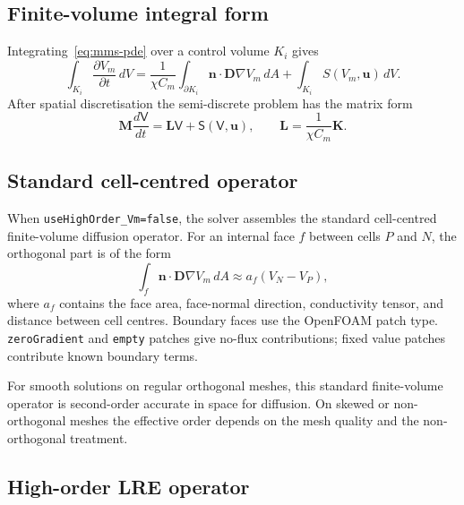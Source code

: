 \documentclass[11pt,a4paper]{article}
\newcommand{\code}[1]{\texttt{\small #1}}
\newcommand{\Vm}{V_m}
\newcommand{\Dten}{\mathbf{D}}
\newcommand{\grad}{\nabla}
\newcommand{\Mmass}{\mathbf{M}}
\newcommand{\Kstif}{\mathbf{K}}
\newcommand{\Lop}{\mathbf{L}}
\begin{document}
\subsection{Finite-volume integral form}

Integrating~\eqref{eq:mms-pde} over a control volume $K_i$ gives
\begin{equation}
  \int_{K_i}\frac{\partial \Vm}{\partial t}\,dV
  =
  \frac{1}{\chi C_m}
  \int_{\partial K_i}\mathbf{n}\cdot\Dten\grad\Vm\,dA
  +
  \int_{K_i}S(\Vm,\mathbf{u})\,dV.
  \label{eq:fv-integral}
\end{equation}
After spatial discretisation the semi-discrete problem has the matrix form
\begin{equation}
  \Mmass \frac{d\mathsf{V}}{dt}
  =
  \Lop \mathsf{V}
  +
  \mathsf{S}(\mathsf{V},\mathbf{u}),
  \qquad
  \Lop = \frac{1}{\chi C_m}\Kstif.
  \label{eq:semidiscrete}
\end{equation}

\subsection{Standard cell-centred operator}

When \code{useHighOrder\_Vm=false}, the solver assembles the standard
cell-centred finite-volume diffusion operator. For an internal face $f$ between
cells $P$ and $N$, the orthogonal part is of the form
\begin{equation}
  \int_f \mathbf{n}\cdot\Dten\grad\Vm\,dA
  \approx
  a_f(V_N-V_P),
\end{equation}
where $a_f$ contains the face area, face-normal direction, conductivity tensor,
and distance between cell centres. Boundary faces use the OpenFOAM patch type.
\code{zeroGradient} and \code{empty} patches give no-flux contributions; fixed
value patches contribute known boundary terms.

For smooth solutions on regular orthogonal meshes, this standard finite-volume
operator is second-order accurate in space for diffusion. On skewed or
non-orthogonal meshes the effective order depends on the mesh quality and the
non-orthogonal treatment.

\subsection{High-order LRE operator}
\end{document}
